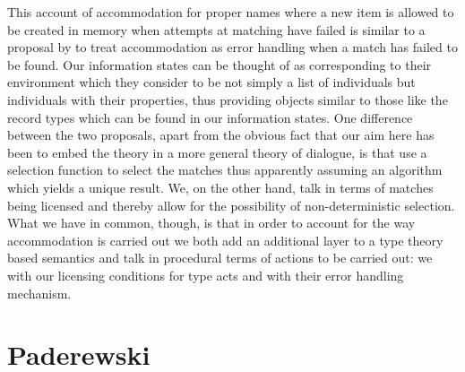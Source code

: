 This account of accommodation for proper names where a new item is
allowed to be created in memory when attempts at matching have failed
is similar to a proposal by \cite{GrooteLebedeva2010} to treat
accommodation as error handling when a match has failed to be found.
Our information states can be thought of as corresponding to their
environment which they consider to be not simply a list of individuals
but individuals with their properties, thus providing objects similar
to those like the record types which can be found in our information
states.  One difference between the two proposals, apart from the
obvious fact that our aim here has been to embed the theory in a more
general theory of dialogue, is that
\citeauthor{GrooteLebedeva2010} use a selection function to select the
matches thus apparently assuming an algorithm which yields a unique
result.  We, on the other hand, talk in terms of matches being licensed
and thereby allow for the possibility of non-deterministic
selection. What we have in common, though, is that in order to account
for the way accommodation is carried out we both add an additional
layer to a type
theory based  semantics and talk in procedural terms of
actions to be carried out:  we with our licensing conditions for type
acts and \citeauthor{GrooteLebedeva2010} with their error handling mechanism.
     
\section{Paderewski}
\label{sec:Paderewski}


